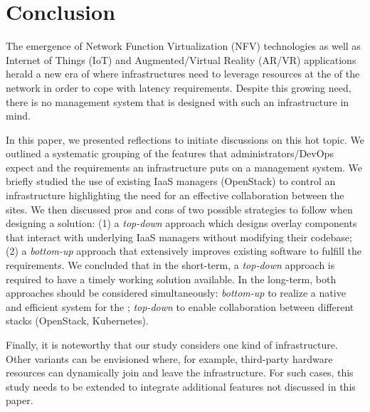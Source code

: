 \section{Conclusion}
\label{sec:conclusion}

The emergence of Network Function Virtualization (NFV) technologies as
well as Internet of Things (IoT) and Augmented/Virtual Reality (AR/VR)
applications herald a new era of \cloudcomputing where infrastructures
need to leverage resources at the \edge of the network in order to cope
with latency requirements.  Despite this growing need, there is no
\cloud management system that is designed with such an infrastructure
in mind.

In this paper, we presented reflections to initiate discussions on this
hot topic. 
We outlined a systematic grouping of the features that administrators/DevOps
expect and the requirements an \edge infrastructure puts on a \cloud management
system.
We briefly studied the use of existing IaaS managers (\ie OpenStack)
to control an \edge infrastructure highlighting the need for an
effective collaboration between the \edge sites.  
We then discussed pros and cons of two possible strategies to follow when
designing a solution: (1) a \emph{top-down} approach which designs overlay
components that interact with underlying IaaS managers without modifying their
codebase; (2) a \emph{bottom-up} approach that extensively
improves existing software to fulfill the requirements. We concluded
that in the short-term, a \emph{top-down} approach is required to have
a timely working solution available. In the long-term, both approaches should be
considered simultaneously: \emph{bottom-up} to realize a native and efficient
system for the \edge; \emph{top-down} to enable collaboration between different
\cloud stacks (\eg OpenStack, Kubernetes).

Finally, it is noteworthy that our study considers one kind of \edge
infrastructure. Other variants can be envisioned where, for example, third-party
hardware resources can dynamically join
and leave the infrastructure. For such cases, this study needs to be
extended to integrate additional features not discussed in this paper.

